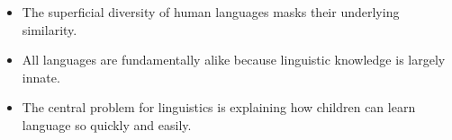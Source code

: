 \documentclass[a4paper,landscape,headrule,footrule]{foils}
\begin{document}
\begin{itemize}
\item The superficial diversity of human languages
masks their underlying similarity.
\item All languages are fundamentally alike
because linguistic knowledge is largely
innate.
\item The central problem for linguistics is
explaining how children can learn language
so quickly and easily.
\end{itemize}


\newcommand{\gr}[2]{#1  (#2)}
\end{document}
